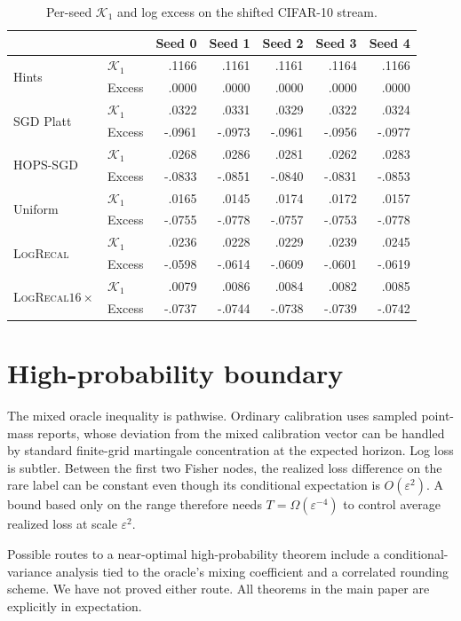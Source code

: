 \documentclass{article}
\newcommand{\method}{\textsc{LogRecal}\xspace}
\newcommand{\calK}{\mathcal{K}}
\begin{document}
\begin{table}[h]
\centering
\caption{Per-seed $\calK_1$ and log excess on the shifted CIFAR-10 stream.}
\label{tab:cifar-seeds}
\small
\begin{tabular}{llrrrrr}
\toprule
& & Seed 0 & Seed 1 & Seed 2 & Seed 3 & Seed 4\\
\midrule
\multirow{2}{*}{Hints}
& $\calK_1$ & .1166 & .1161 & .1161 & .1164 & .1166\\
& Excess & .0000 & .0000 & .0000 & .0000 & .0000\\
\multirow{2}{*}{SGD Platt}
& $\calK_1$ & .0322 & .0331 & .0329 & .0322 & .0324\\
& Excess & -.0961 & -.0973 & -.0961 & -.0956 & -.0977\\
\multirow{2}{*}{HOPS-SGD}
& $\calK_1$ & .0268 & .0286 & .0281 & .0262 & .0283\\
& Excess & -.0833 & -.0851 & -.0840 & -.0831 & -.0853\\
\multirow{2}{*}{Uniform}
& $\calK_1$ & .0165 & .0145 & .0174 & .0172 & .0157\\
& Excess & -.0755 & -.0778 & -.0757 & -.0753 & -.0778\\
\multirow{2}{*}{\method}
& $\calK_1$ & .0236 & .0228 & .0229 & .0239 & .0245\\
& Excess & -.0598 & -.0614 & -.0609 & -.0601 & -.0619\\
\multirow{2}{*}{\method $16\times$}
& $\calK_1$ & .0079 & .0086 & .0084 & .0082 & .0085\\
& Excess & -.0737 & -.0744 & -.0738 & -.0739 & -.0742\\
\bottomrule
\end{tabular}
\end{table}

\section{High-probability boundary}
\label{app:high-prob}

The mixed oracle inequality is pathwise. Ordinary calibration uses sampled point-mass reports, whose deviation from the mixed calibration vector can be handled by standard finite-grid martingale concentration at the expected horizon. Log loss is subtler. Between the first two Fisher nodes, the realized loss difference on the rare label can be constant even though its conditional expectation is $O(\varepsilon^2)$. A bound based only on the range therefore needs $T=\Omega(\varepsilon^{-4})$ to control average realized loss at scale $\varepsilon^2$.

Possible routes to a near-optimal high-probability theorem include a conditional-variance analysis tied to the oracle's mixing coefficient and a correlated rounding scheme. We have not proved either route. All theorems in the main paper are explicitly in expectation.
\end{document}
